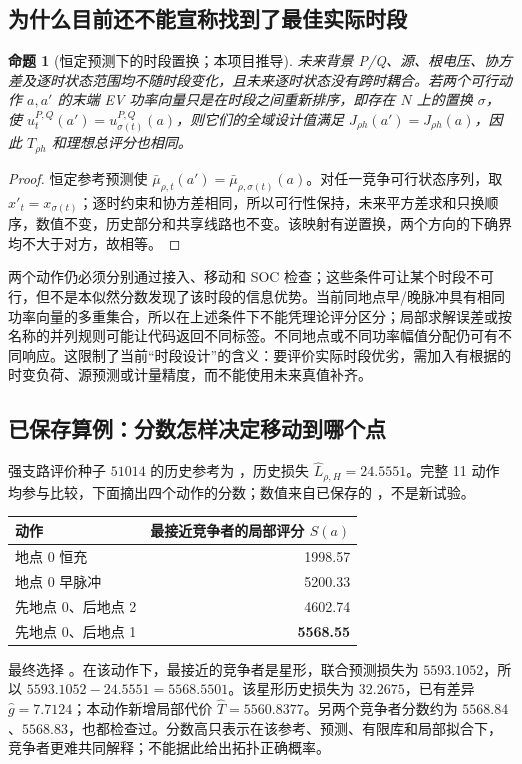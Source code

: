 \documentclass[UTF8,fontset=fandol,11pt,a4paper]{ctexart}
\newtheorem{proposition}{命题}
\begin{document}
\subsection{为什么目前还不能宣称找到了最佳实际时段}
\begin{proposition}[恒定预测下的时段置换；本项目推导]
未来背景 P/Q、源、根电压、协方差及逐时状态范围均不随时段变化，且未来逐时状态没有跨时耦合。若两个可行动作 $a,a'$ 的末端 EV 功率向量只是在时段之间重新排序，即存在 $N$ 上的置换 $\sigma$，使 $u_t^{P,Q}(a')=u_{\sigma(t)}^{P,Q}(a)$，则它们的全域设计值满足 $J_{\rho h}(a')=J_{\rho h}(a)$，因此 $T_{\rho h}$ 和理想总评分也相同。
\end{proposition}
\begin{proof}
恒定参考预测使 $\bar\mu_{\rho,t}(a')=\bar\mu_{\rho,\sigma(t)}(a)$。对任一竞争可行状态序列，取 $x'_t=x_{\sigma(t)}$；逐时约束和协方差相同，所以可行性保持，未来平方差求和只换顺序，数值不变，历史部分和共享线路也不变。该映射有逆置换，两个方向的下确界均不大于对方，故相等。
\end{proof}
两个动作仍必须分别通过接入、移动和 SOC 检查；这些条件可让某个时段不可行，但不是本似然分数发现了该时段的信息优势。当前同地点早/晚脉冲具有相同功率向量的多重集合，所以在上述条件下不能凭理论评分区分；局部求解误差或按名称的并列规则可能让代码返回不同标签。不同地点或不同功率幅值分配仍可有不同响应。这限制了当前“时段设计”的含义：要评价实际时段优劣，需加入有根据的时变负荷、源预测或计量精度，而不能使用未来真值补齐。


\subsection{已保存算例：分数怎样决定移动到哪个点}
强支路评价种子 $51014$ 的历史参考为 ，历史损失 $\widehat L_{\rho,H}=24.5551$。完整 11 动作均参与比较，下面摘出四个动作的分数；数值来自已保存的 ，不是新试验。
\begin{center}\small
\begin{tabular}{lr}\toprule
动作 & 最接近竞争者的局部评分 $\widehat S(a)$\\\midrule
地点 0 恒充 & 1998.57\\
地点 0 早脉冲 & 5200.33\\
先地点 0、后地点 2 & 4602.74\\
先地点 0、后地点 1 & \textbf{5568.55}\\\bottomrule
\end{tabular}
\end{center}
最终选择 。在该动作下，最接近的竞争者是星形，联合预测损失为 $5593.1052$，所以 $5593.1052-24.5551=5568.5501$。该星形历史损失为 $32.2675$，已有差异 $\widehat g=7.7124$；本动作新增局部代价 $\widehat T=5560.8377$。另两个竞争者分数约为 $5568.84$、$5568.83$，也都检查过。分数高只表示在该参考、预测、有限库和局部拟合下，竞争者更难共同解释；不能据此给出拓扑正确概率。
\end{document}
